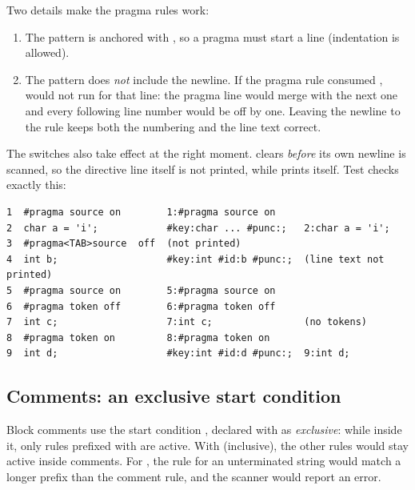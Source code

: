 \documentclass[12pt]{article}
\begin{document}
Two details make the pragma rules work:

\begin{enumerate}
  \item The pattern is anchored with \code{^}, so a pragma must start a line (indentation is allowed).
  \item The pattern does \emph{not} include the newline. If the pragma rule consumed \code{\n}, 
        would not run for that line: the pragma line would merge with the next one and every following
        line number would be off by one. Leaving the newline to the \code{\n} rule keeps both the
        numbering and the line text correct.
\end{enumerate}

The switches also take effect at the right moment.  clears
 \emph{before} its own newline is scanned, so the directive line itself is not printed,
while  prints itself. Test  checks exactly this:

\begin{lstlisting}[language={},numbers=none,title={\codetitle{tests/07\_pragma: input (left) and expected output, abridged (right)}}]
1  #pragma source on        1:#pragma source on
2  char a = 'i';            #key:char ... #punc:;   2:char a = 'i';
3  #pragma<TAB>source  off  (not printed)
4  int b;                   #key:int #id:b #punc:;  (line text not printed)
5  #pragma source on        5:#pragma source on
6  #pragma token off        6:#pragma token off
7  int c;                   7:int c;                (no tokens)
8  #pragma token on         8:#pragma token on
9  int d;                   #key:int #id:d #punc:;  9:int d;
\end{lstlisting}

\subsection{Comments: an exclusive start condition}


Block comments use the start condition , declared with  as \emph{exclusive}: while
inside it, only rules prefixed with  are active. With  (inclusive), the other rules
would stay active inside comments. For , the rule for an unterminated string would
match a longer prefix than the comment rule, and the scanner would report an error.
\end{document}
